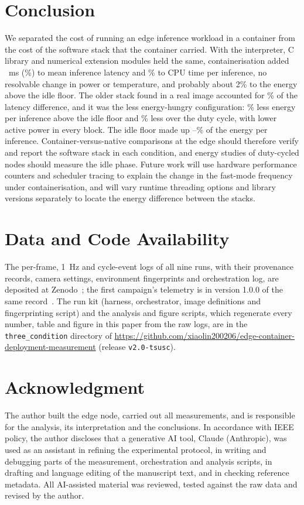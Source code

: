 \documentclass[10pt,journal,compsoc]{IEEEtran}
\begin{document}
\section{Conclusion}\label{sec:conclusion}
We separated the cost of running an edge inference workload in a container from the cost of the software stack that the container carried. With the interpreter, C library and numerical extension modules held the same, containerisation added \LatMeanBAabs~ms (\LatMeanBApctabs\%) to mean inference latency and \CPUmsBApctabs\% to CPU time per inference, no resolvable change in power or temperature, and probably about 2\% to the energy above the idle floor. The older stack found in a real image accounted for \ShareStack\% of the latency difference, and it was the less energy-hungry configuration: \EIncCBpctabs\% less energy per inference above the idle floor and \ECycCBpctabs\% less over the duty cycle, with lower active power in every block. The idle floor made up \EBaseShareLo--\EBaseShareHi\% of the energy per inference. Container-versus-native comparisons at the edge should therefore verify and report the software stack in each condition, and energy studies of duty-cycled nodes should measure the idle phase. Future work will use hardware performance counters and scheduler tracing to explain the change in the fast-mode frequency under containerisation, and will vary runtime threading options and library versions separately to locate the energy difference between the stacks.

\section*{Data and Code Availability}
The per-frame, 1~Hz and cycle-event logs of all nine runs, with their provenance records, camera settings, environment fingerprints and orchestration log, are deposited at Zenodo~\cite{lin2026datasetv2}; the first campaign's telemetry is in version 1.0.0 of the same record~\cite{lin2026datasetv1}. The run kit (harness, orchestrator, image definitions and fingerprinting script) and the analysis and figure scripts, which regenerate every number, table and figure in this paper from the raw logs, are in the \texttt{three\_condition} directory of \url{https://github.com/xiaolin200206/edge-container-deployment-measurement} (release \texttt{v2.0-tsusc}).

\section*{Acknowledgment}
The author built the edge node, carried out all measurements, and is responsible for the analysis, its interpretation and the conclusions. In accordance with IEEE policy, the author discloses that a generative AI tool, Claude (Anthropic), was used as an assistant in refining the experimental protocol, in writing and debugging parts of the measurement, orchestration and analysis scripts, in drafting and language editing of the manuscript text, and in checking reference metadata. All AI-assisted material was reviewed, tested against the raw data and revised by the author.



\end{document}
